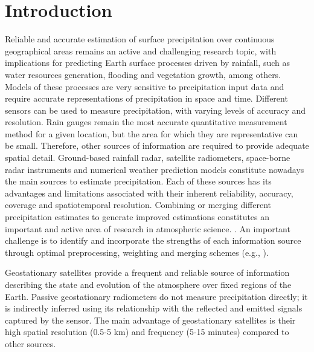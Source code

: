 \documentclass[3p,times]{elsarticle}
\begin{document}

\linenumbers

\section{Introduction}
\label{}

Reliable and accurate estimation of surface precipitation over continuous geographical areas remains an active and challenging research topic, with implications for predicting Earth surface processes driven by rainfall, such as water resources generation, flooding and vegetation growth, among others. Models of these processes are very sensitive to precipitation input data and require accurate representations of precipitation in space and time. Different sensors can be used to measure precipitation, with varying levels of accuracy and resolution. Rain gauges remain the most accurate quantitative measurement method for a given location, but the area for which they are representative can be small. Therefore, other sources of information are required to provide adequate spatial detail. Ground-based rainfall radar, satellite radiometers, space-borne radar instruments and numerical weather prediction models constitute nowadays the main sources to estimate precipitation. Each of these sources has its advantages and limitations associated with their inherent reliability, accuracy, coverage and spatiotemporal resolution. Combining or merging different precipitation estimates to generate improved estimations constitutes an important and active area of research in atmospheric science. \citep{gourley2002exploratory,sideris2014real,nerini2015comparative,hasan2016merging}. An important challenge is to identify and incorporate the strengths of each information source through optimal preprocessing, weighting and merging schemes (e.g., \citep{beck2019mswep,beck2020evaluation}). 

Geostationary satellites provide a frequent and reliable source of information describing the state and evolution of the atmosphere over fixed regions of the Earth. Passive geostationary radiometers do not measure precipitation directly; it is indirectly inferred using its relationship with the reflected and emitted signals captured by the sensor. The main advantage of geostationary satellites is their high spatial resolution (0.5-5 km) and frequency (5-15 minutes) compared to other sources.
\end{document}
